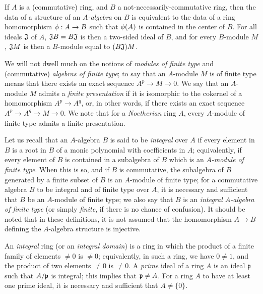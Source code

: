 \begin{env}[1.0.4]
\label{0.1.0.4}
If $A$ is a (commutative) ring, and $B$ a not-necessarily-commutative ring, then the data of a structure of an {\em $A$-algebra} on $B$ is equivalent to the data of a ring homomorphism $\phi:A\to B$ such that $\phi(A)$ is contained in the center of $B$.
For all ideals $\mathfrak{J}$ of $A$, $\mathfrak{J}B=B\mathfrak{J}$ is then a two-sided ideal of $B$, and for every $B$-module $M$, $\mathfrak{J}M$ is then a $B$-module equal to $(B\mathfrak{J})M$.
\end{env}

\begin{env}[1.0.5]
\label{0.1.0.5}
We will not dwell much on the notions of {\em modules of finite type} and
(commutative) {\em algebras of finite type};
to say that an $A$-module $M$ is of finite type means that there exists  an exact sequence $A^p\to M\to 0$.
We say that an $A$-module $M$ admits a {\em finite presentation} if it is isomorphic to the cokernel of a homomorphism $A^p\to A^q$, or, in other words, if there exists an exact sequence $A^p\to A^q\to M\to 0$.
We note that for a {\em Noetherian} ring $A$, every $A$-module of finite type admits a finite presentation.

Let us recall that an $A$-algebra $B$ is said to be {\em integral} over $A$ if every element in $B$ is a root in $B$ of a monic polynomial with coefficients in $A$;
equivalently, if every element of $B$ is contained in a subalgebra of $B$ which is an {\em $A$-module of finite type}.
When this is so, and if $B$ is commutative, the subalgebra of $B$ generated by a finite subset of $B$ is an $A$-module of finite type;
for a commutative algebra $B$ to be integral and of finite type over $A$, it is necessary and sufficient that $B$ be an $A$-module of finite type;
we also say that $B$ is an {\em integral $A$-algebra of finite type} (or simply {\em finite}, if there is no chance of confusion).
It should be noted that in these definitions, it is not assumed that the homomorphism $A\to B$ defining the $A$-algebra structure is injective.
\end{env}

\begin{env}[1.0.6]
\label{0.1.0.6}
An {\em integral} ring (or an {\em integral domain}) is a ring in which the product of a finite family of elements $\neq 0$ is $\neq 0$;
equivalently, in such a ring, we have $0\neq 1$, and the product of two elements $\neq 0$ is $\neq0$.
A {\em prime} ideal of a ring $A$ is an ideal $\mathfrak{p}$ such that $A/\mathfrak{p}$ is integral;
this implies that $\mathfrak{p}\neq A$.
For a ring $A$ to have at least one prime ideal, it is necessary and sufficient that $A\neq\{0\}$.
\end{env}

